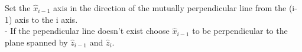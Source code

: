 \documentclass[preview]{standalone}
\begin{document}
\begin{center}
Set the $\hat{x}_{i-1}$ axis in the direction of the mutually perpendicular line from the (i-1) axis to the i axis.\\- If the pependicular line doesn't exist choose $\hat{x}_{i-1}$ to be perpendicular to the plane spanned by $\hat{z}_{i-1}$ and $\hat{z}_{i}$.
\end{center}
\end{document}
